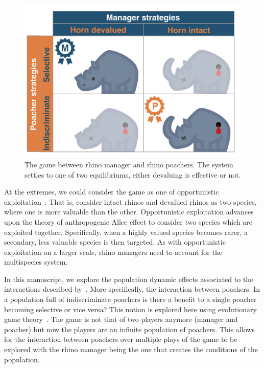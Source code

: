 \documentclass[10pt]{article}
\begin{document}
\begin{figure}[!htbp]
    \centering
    \includegraphics[scale=0.2]{images/RhinoPic.pdf}
    \caption{\label{fig:RhinoPic} The game between rhino manager and rhino
    poachers. The system settles to one of two equilibriums, either devaluing is effective or not.}
\end{figure}

At the extremes, we could consider the game as one of opportunistic exploitation~\cite{branch2013opportunistic}.
That is, consider intact rhinos and devalued rhinos as two species, where one is more valuable than
the other. Opportunistic exploitation advances upon the theory of anthropogenic Allee
effect to consider two species which are exploited together. Specifically, when a
highly valued species becomes rarer, a secondary, less valuable species is then targeted.
As with opportunistic exploitation on a larger scale, rhino managers need to account for
the multispecies system.

In this manuscript, we explore the population dynamic effects associated to
the interactions described by~\cite{Lee}. More specifically, the interaction between
poachers. In a population full of indiscriminate poachers is there
a benefit to a single poacher becoming selective or vice versa? This notion
is explored here using evolutionary game theory~\cite{Smith}. The
game is not that of two players anymore (manager and poacher) but now the players
are an infinite population of poachers. This allows for the interaction between
poachers over multiple plays of the game to be explored with the rhino manager
being the one that creates the conditions of the population.
\end{document}
